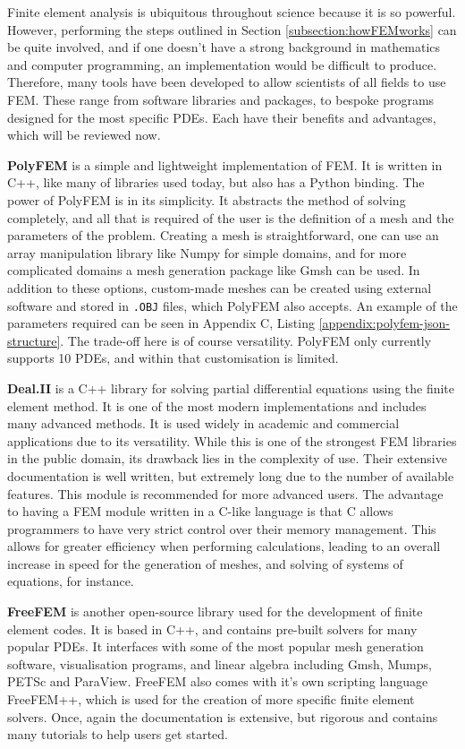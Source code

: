 Finite element analysis is ubiquitous throughout science because it is so powerful. However, performing the steps outlined in Section \ref{subsection:howFEMworks} can be quite involved, and if one doesn't have a strong background in mathematics and computer programming, an implementation would be difficult to produce. Therefore, many tools have been developed to allow scientists of all fields to use FEM. These range from software libraries and packages, to bespoke programs designed for the most specific PDEs. Each have their benefits and advantages, which will be reviewed now.

\textbf{PolyFEM} \cite{polyfem} is a simple and lightweight implementation of FEM. It is written in C++, like many of libraries used today, but also has a Python binding. The power of PolyFEM is in its simplicity. It abstracts the method of solving completely, and all that is required of the user is the definition of a mesh and the parameters of the problem. Creating a mesh is straightforward, one can use an array manipulation library like Numpy for simple domains, and for more complicated domains a mesh generation package like Gmsh can be used. In addition to these options, custom-made meshes can be created using external software and stored in \verb|.OBJ| files, which PolyFEM also accepts. An example of the parameters required can be seen in Appendix C, Listing \ref{appendix:polyfem-json-structure}. The trade-off here is of course versatility. PolyFEM only currently supports 10 PDEs, and within that customisation is limited.

\textbf{Deal.II} \cite{deal-ii} is a C++ library for solving partial differential equations using the finite element method. It is one of the most modern implementations and includes many advanced methods. It is used widely in academic and commercial applications due to its versatility. While this is one of the strongest FEM libraries in the public domain, its drawback lies in the complexity of use. Their extensive documentation is well written, but extremely long due to the number of available features. This module is recommended for more advanced users. The advantage to having a FEM module written in a C-like language is that C allows programmers to have very strict control over their memory management. This allows for greater efficiency when performing calculations, leading to an overall increase in speed for the generation of meshes, and solving of systems of equations, for instance.

\textbf{FreeFEM} \cite{freefem} is another open-source library used for the development of finite element codes. It is based in C++, and contains pre-built solvers for many popular PDEs. It interfaces with some of the most popular mesh generation software, visualisation programs, and linear algebra  including Gmsh, Mumps, PETSc and ParaView. FreeFEM also comes with it's own scripting language FreeFEM++, which is used for the creation of more specific finite element solvers. Once, again the documentation is extensive, but rigorous and contains many tutorials to help users get started.

